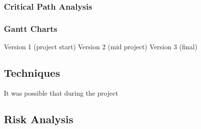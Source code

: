 \subsubsection{Critical Path Analysis}

\subsubsection{Gantt Charts}
Version 1 (project start)
Version 2 (mid project)
Version 3 (final)

\subsection{Techniques}
It was possible that during the project

\subsection{Risk Analysis}


